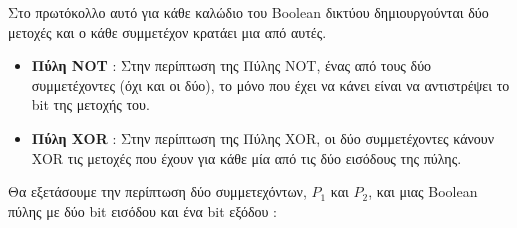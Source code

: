 Στο πρωτόκολλο αυτό για κάθε καλώδιο του Boolean δικτύου δημιουργούνται δύο μετοχές και ο κάθε συμμετέχον κρατάει μια από αυτές.

\begin{itemize}
    \item \textbf{Πύλη NOT} : Στην περίπτωση της Πύλης NOT, ένας από τους δύο συμμετέχοντες (όχι και οι δύο), το μόνο που έχει να κάνει είναι να αντιστρέψει το bit της μετοχής του.
    \item \textbf{Πύλη XOR} : Στην περίπτωση της Πύλης XOR, οι δύο συμμετέχοντες κάνουν XOR τις μετοχές που έχουν για κάθε μία από τις δύο εισόδους της πύλης.
\end{itemize}

Θα εξετάσουμε την περίπτωση δύο συμμετεχόντων, $P_1$ και $P_2$, και μιας Boolean πύλης με δύο bit εισόδου και ένα bit εξόδου :
